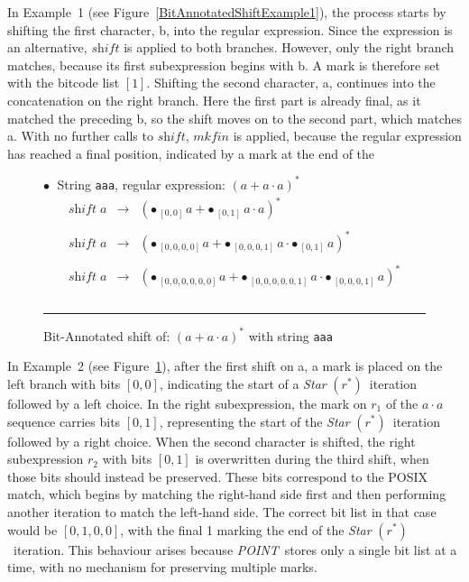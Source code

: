 \documentclass[12pt]{article}
\newcommand{\shift}{\textit{shift}}
\newcommand{\Marked}[1]{\bullet\,#1}
\newcommand{\POINT}{\textit{POINT}}
\newcommand{\mkfin}{\textit{mkfin}}
\newcommand{\STARText}{\textit{Star} $(r^*)$}
\begin{document}
In Example~1 (see Figure~\ref{BitAnnotatedShiftExample1}), the process starts by shifting the
first character, b, into the regular expression. Since the expression is an alternative, $\shift$ is
applied to both branches. However, only the right branch matches, because its first subexpression
begins with b. A mark is therefore set with the bitcode list $[1]$. Shifting the second character, a,
continues into the concatenation on the right branch. Here the first part is already final, as it
matched the preceding b, so the shift moves on to the second part, which matches a. With no further
calls to $\shift$, $\mkfin$ is applied, because the regular expression has reached a final position,
indicated by a mark at the end of the

  \begin{figure}[ht]
    $\bullet\;$ String \texttt{aaa}, regular expression: $(a + a \cdot a)^*$
    \[
    \begin{array}{rcl}
      \shift\; a & \rightarrow & ( \Marked{_{[0,0]\,} a} +  \Marked{_{[0,1]}\,a \cdot a} )^*\\\\
      \shift\; a & \rightarrow & ( \Marked{_{[0,0,0,0]\,} a} +  \Marked{_{[0,0,0,1]}\,a \cdot \Marked{_{[0,1]}\,a} } )^*\\\\ 
      \shift\; a & \rightarrow & ( \Marked{_{[0,0,0,0,0,0]\,} a} +  \Marked{_{[0,0,0,0,0,1]}\,a \cdot \Marked{_{[0,0,0,1]}\,a} } )^*\\\\
    \end{array}
    \]

    \mbox{}
    \hrule
    
    \caption{Bit-Annotated shift of: $(a + a \cdot a)^*$ with string \texttt{aaa}} \label{BitAnnotatedShiftExample2}
  \end{figure}
In Example~2 (see Figure~\ref{BitAnnotatedShiftExample2}), after the first shift on a, a mark is
placed on the left branch with bits $[0,0]$, indicating the start of a \STARText\ iteration followed by a
left choice. In the right subexpression, the mark on $r_1$ of the $a \cdot a$ sequence carries bits $[0,1]$,
representing the start of the \STARText\ iteration followed by a right choice. When the second character is shifted, the right subexpression $r_2$ with bits $[0,1]$ is overwritten during
the third shift, when those bits should instead be preserved. These bits correspond to the POSIX match,
which begins by matching the right-hand side first and then performing another iteration to match the
left-hand side. The correct bit list in that case would be $[0,1,0,0]$, with the final 1 marking the end of
the \STARText\ iteration. This behaviour arises because \POINT\ stores only a single bit list at a time,
with no mechanism for preserving multiple marks.
\end{document}
